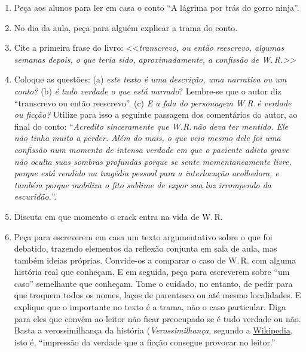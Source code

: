 \documentclass[12pt]{extarticle}
\begin{document}
   \begin{enumerate}
   	\item Peça aos alunos para ler em casa o conto ``A lágrima por trás do gorro ninja''. 

   	\item No dia da aula, peça para alguém explicar a trama do conto. 

   	\item Cite a primeira frase do livro: <<\emph{transcrevo, ou então reescrevo, algumas semanas depois, o que teria sido, aproximadamente, a confissão de W.\,R.>>}

   	\item Coloque as questões: 
   	(a) \textit{este texto é uma descrição, uma narrativa ou um conto?}
   	(b) \textit{é tudo verdade o que está narrado}? Lembre-se que o autor diz  
   	``transcrevo ou então reescrevo''. 
   	(c) \textit{E a fala do personagem W.R.\,é verdade ou ficção?} Utilize para isso a 
   	seguinte passagem dos comentários do autor, ao final do conto:
   	``\emph{Acredito sinceramente que {W.R.}\,não deva ter mentido. Ele não tinha
	muito a perder. Além do mais, o que veio mesmo dele foi uma confissão
	num momento de intensa verdade em que o paciente adicto grave não oculta
	suas sombras profundas porque se sente momentaneamente livre, porque
	está rendido na tragédia pessoal para a interlocução acolhedora, e
	também porque mobiliza o fito sublime de expor sua luz irrompendo da
	escuridão.}''.
 
   	\item Discuta em que momento o crack entra na vida de W.\,R. 

	\item 
	Peça para escreverem em casa um texto argumentativo sobre o que foi 
	debatido, trazendo elementos da reflexão conjunta em sala de aula, mas também ideias próprias.
	Convide-os a comparar o caso de W.\,R. com alguma história real que conheçam. 
	E em seguida, peça para escreverem sobre ``um caso'' semelhante que conheçam.
	Tome o cuidado, no entanto, de pedir para que troquem todos os nomes, laços de
	parentesco ou até mesmo localidades. E explique que o importante no texto 
	é a trama, não o caso particular. Diga para eles que convém 
	ao leitor não ficar preocupado se é tudo verdade ou não. Basta a 
	verossimilhança da história (\emph{Verossimilhança}, segundo a \href{https://pt.wikipedia.org/wiki/Verossimilhan%C3%A7a#:~:text=Verossimilhan%C3%A7a%20%C3%A9%20a%20impress%C3%A3o%20da,que%20acontecem%20na%20realidade%20vivida}{Wikipedia}, isto é, ``impressão da verdade que a ficção 
	consegue provocar no leitor.''
   \end{enumerate}
\end{document}
